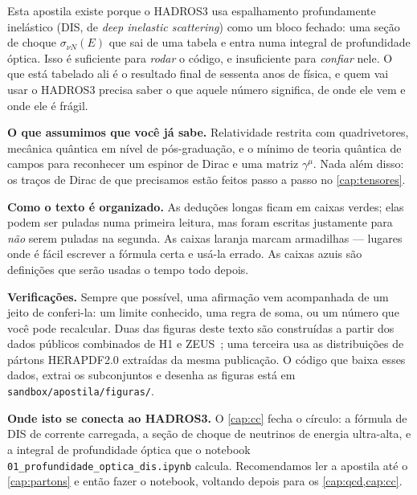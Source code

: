 \documentclass[11pt,a4paper,oneside]{report}
\begin{document}
Esta apostila existe porque o HADROS3 usa espalhamento profundamente inelástico
(DIS, de \emph{deep inelastic scattering}) como um bloco fechado: uma seção de
choque $\sigma_{\nu N}(E)$ que sai de uma tabela e entra numa integral de
profundidade óptica. Isso é suficiente para \emph{rodar} o código, e insuficiente
para \emph{confiar} nele. O que está tabelado ali é o resultado final de sessenta
anos de física, e quem vai usar o HADROS3 precisa saber o que aquele número
significa, de onde ele vem e onde ele é frágil.

\medskip
\noindent\textbf{O que assumimos que você já sabe.} Relatividade restrita com
quadrivetores, mecânica quântica em nível de pós-graduação, e o mínimo de teoria
quântica de campos para reconhecer um espinor de Dirac e uma matriz $\gamma^\mu$.
Nada além disso: os traços de Dirac de que precisamos estão feitos passo a passo
no \cref{cap:tensores}.

\medskip
\noindent\textbf{Como o texto é organizado.} As deduções longas ficam em caixas
verdes; elas podem ser puladas numa primeira leitura, mas foram escritas
justamente para \emph{não} serem puladas na segunda. As caixas laranja marcam
armadilhas --- lugares onde é fácil escrever a fórmula certa e usá-la errado. As
caixas azuis são definições que serão usadas o tempo todo depois.

\medskip
\noindent\textbf{Verificações.} Sempre que possível, uma afirmação vem
acompanhada de um jeito de conferi-la: um limite conhecido, uma regra de soma,
ou um número que você pode recalcular. Duas das figuras deste texto são
construídas a partir dos dados públicos combinados de H1 e ZEUS~\cite{H1:2015ubc};
uma terceira usa as distribuições de pártons HERAPDF2.0 extraídas da mesma
publicação. O código que baixa esses dados, extrai os subconjuntos e desenha as
figuras está em \texttt{sandbox/apostila/figuras/}.

\medskip
\noindent\textbf{Onde isto se conecta ao HADROS3.} O \cref{cap:cc} fecha o
círculo: a fórmula de DIS de corrente carregada, a seção de choque de neutrinos
de energia ultra-alta, e a integral de profundidade óptica que o notebook
\texttt{01\_profundidade\_optica\_dis.ipynb} calcula. Recomendamos ler a apostila
até o \cref{cap:partons} e então fazer o notebook, voltando depois para os
\cref{cap:qcd,cap:cc}.

\tableofcontents

\cleardoublepage
{}

\end{document}
